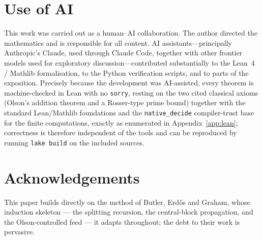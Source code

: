 \documentclass[11pt]{amsart}
\theoremstyle{plain}
\theoremstyle{definition}
\begin{document}
\section*{Use of AI}
This work was carried out as a human--AI collaboration. The author directed the
mathematics and is responsible for all content. AI assistants---principally
Anthropic's Claude, used through Claude Code, together with other frontier models
used for exploratory discussion---contributed substantially to the Lean~4 / Mathlib
formalisation, to the Python verification scripts, and to parts of the exposition.
Precisely because the development was AI-assisted, every theorem is machine-checked
in Lean with no \texttt{sorry}, resting on the two cited classical axioms (Olson's
addition theorem and a Rosser-type prime bound) together with the standard
Lean/Mathlib foundations and the \texttt{native\_decide} compiler-trust base for the
finite computations, exactly as enumerated in Appendix~\ref{app:lean}; correctness is
therefore independent of the tools and can be reproduced by running \texttt{lake build}
on the included sources.

\section*{Acknowledgements}
This paper builds directly on the method of Butler, Erd\H{o}s and Graham, whose
induction skeleton --- the splitting recursion, the central-block propagation, and
the Olson-controlled feed --- it adapts throughout; the debt to their work is
pervasive.
\end{document}
